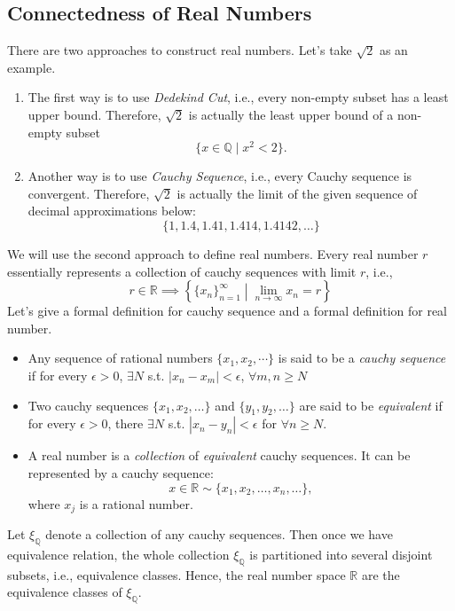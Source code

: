 \subsection{Connectedness of Real Numbers}
There are two approaches to construct real numbers. Let's take $\sqrt{2}$ as an example.
\begin{enumerate}
\item
The first way is to use \emph{Dedekind Cut}, i.e., every non-empty subset has a least upper bound. Therefore, $\sqrt{2}$ is actually the least upper bound of a non-empty subset
\[
\{x\in\mathbb{Q}\mid x^2<2\}.
\]
\item
Another way is to use \emph{Cauchy Sequence}, i.e., every Cauchy sequence is convergent. Therefore, $\sqrt{2}$ is actually the limit of the given sequence of decimal approximations below:
\[
\{1,1.4,1.41,1.414,1.4142,\dots\}
\]
\end{enumerate}
We will use the second approach to define real numbers. Every real number $r$ essentially represents a collection of cauchy sequences with limit $r$, i.e.,
\[
r\in\mathbb{R}
\implies
\left\{
\{x_n\}_{n=1}^\infty\middle|
\lim_{n\to\infty}x_n=r
\right\}
\]
Let's give a formal definition for cauchy sequence and a formal definition for real number.
\begin{definition}
\begin{itemize}
\item
Any sequence of rational numbers $\{x_1,x_2,\cdots\}$ is said to be a \emph{cauchy sequence} if for every $\epsilon>0$, $\exists N$ s.t. $|x_n-x_m|<\epsilon$, $\forall m,n\ge N$
\item
Two cauchy sequences $\{x_1,x_2,\dots\}$ and $\{y_1,y_2,\dots\}$ are said to be \emph{equivalent} if for every $\epsilon>0$, there $\exists N$ s.t. $|x_n-y_n|<\epsilon$ for $\forall n\ge N$.
\item
A real number is a \emph{collection} of \emph{equivalent} cauchy sequences. It can be represented by a cauchy sequence:
\[
x\in\mathbb{R}\sim\{x_1,x_2,\dots,x_n,\dots\},
\]
where $x_j$ is a rational number.
\end{itemize}
\end{definition}
\begin{remark}
Let $\xi_{\mathbb{Q}}$ denote a collection of any cauchy sequences. Then once we have equivalence relation, the whole collection $\xi_{\mathbb{Q}}$ is partitioned into several disjoint subsets, i.e., equivalence classes. Hence, the real number space $\mathbb{R}$ are the equivalence classes of $\xi_{\mathbb{Q}}$.
\end{remark}

